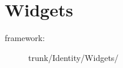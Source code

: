 
\section{Widgets}
\hypertarget{sec:Concepts:Identity:Widgets}{}
\label{sec:Concepts:Identity:Widgets}

\begin{description}
\item[framework:] trunk/Identity/Widgets/
\end{description}
